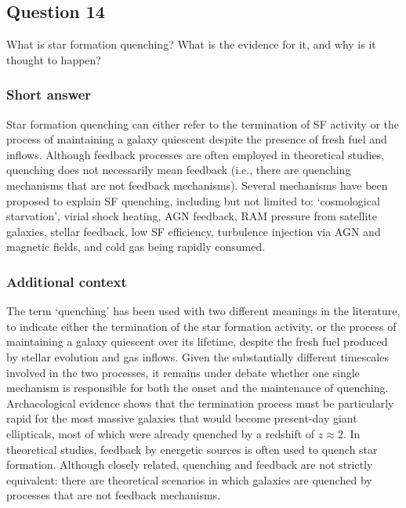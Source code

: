 \documentclass[a4paper,11pt]{article}
\begin{document}

\newpage
\subsection{Question 14}

What is star formation quenching? What is the evidence for it, and why is it thought to happen?

\subsubsection{Short answer}

Star formation quenching can either refer to the termination of SF activity or the process of maintaining a galaxy quiescent despite the presence of fresh fuel and inflows. Although feedback processes are often employed in theoretical studies, quenching does not necessarily mean feedback (i.e., there are quenching mechanisms that are not feedback mechanisms). Several mechanisms have been proposed to explain SF quenching, including but not limited to: `cosmological starvation', virial shock heating, AGN feedback, RAM pressure from satellite galaxies, stellar feedback, low SF efficiency, turbulence injection via AGN and magnetic fields, and cold gas being rapidly consumed.

\subsubsection{Additional context}

The term `quenching' has been used with two different meanings in the literature, to indicate either the termination of the star formation activity, or the process of maintaining a galaxy quiescent over its lifetime, despite the fresh fuel produced by stellar evolution and gas inflows. Given the substantially different timescales involved in the two processes, it remains under debate whether one single mechanism is responsible for both the onset and the maintenance of quenching. Archaeological evidence shows that the termination process must be particularly rapid for the most massive galaxies that would become present-day giant ellipticals, most of which were already quenched by a redshift of $z\approx2$. In theoretical studies, feedback by energetic sources is often used to quench star formation. Although closely related, quenching and feedback are not strictly equivalent: there are theoretical scenarios in which galaxies are quenched by processes that are not feedback mechanisms.
\end{document}
